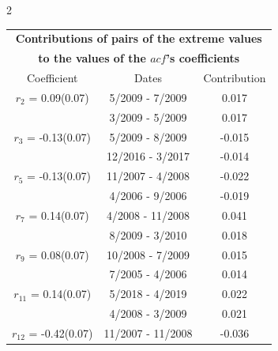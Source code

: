 
\thispagestyle{empty}
\begin{multicols}{2}{ 
\begin{tabular}{ccc}
\multicolumn{3}{c}{\textbf{Contributions of pairs of the extreme values} }  \vspace{-.10in}  \\ 
\multicolumn{3}{c}{ \textbf{to the values of the $acf$'s coefficients}} \\ 
\hline 
\hline                  Coefficient  &  Dates &  Contribution \\ 
\hline 
  $r_{ 2}$ = 0.09(0.07) &       5/2009 -  7/2009 &        0.017   \vspace{-.10in} \\  
&        3/2009 -  5/2009 &        0.017  \vspace{-.02in} \\ \hline 
  $r_{ 3}$ = -0.13(0.07) &       5/2009 -  8/2009 &       -0.015    \vspace{-.10in} \\ 
  &       12/2016 -  3/2017 &       -0.014  \vspace{-.02in}   \\ \hline 
    $r_{ 5}$ = -0.13(0.07) &      11/2007 -  4/2008 &       -0.022    \vspace{-.10in} \\ 
  &        4/2006 -  9/2006 &       -0.019  \vspace{-.02in}   \\ \hline 
    $r_{ 7}$ = 0.14(0.07) &       4/2008 - 11/2008 &        0.041   \vspace{-.10in} \\  
&        8/2009 -  3/2010 &        0.018  \vspace{-.02in} \\ \hline 
  $r_{ 9}$ = 0.08(0.07) &      10/2008 -  7/2009 &        0.015   \vspace{-.10in} \\  
&        7/2005 -  4/2006 &        0.014  \vspace{-.02in} \\ \hline 
  $r_{11}$ = 0.14(0.07) &       5/2018 -  4/2019 &        0.022   \vspace{-.10in} \\  
&        4/2008 -  3/2009 &        0.021  \vspace{-.02in} \\ \hline 
  $r_{12}$ = -0.42(0.07) &      11/2007 - 11/2008 &       -0.036    \vspace{-.10in} \\ 

\end{tabular}}
\end{multicols}
